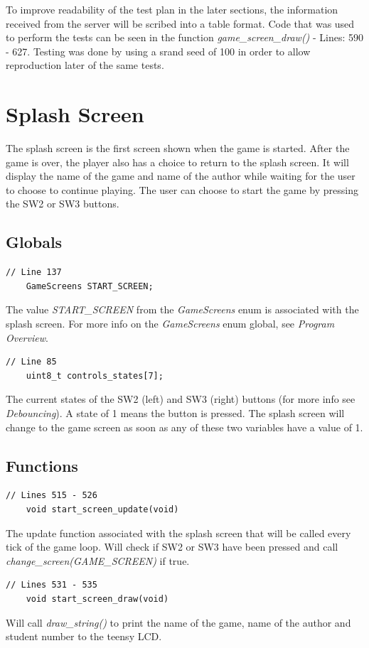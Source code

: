 \documentclass{article}
\begin{document}
To improve readability of the test plan in the later sections, the information received from the server will be scribed into a table format. Code that was used to perform the tests can be seen in the function \emph{game\_screen\_draw()} - Lines: 590 - 627.
\newline
\newline
Testing was done by using a srand seed of 100 in order to allow reproduction later of the same tests. 
\clearpage

\section{Splash Screen}
The splash screen is the first screen shown when the game is started. After the game is over, the player also has a choice to return to the splash screen. It will display the name of the game and name of the author while waiting for the user to choose to continue playing. The user can choose to start the game by pressing the SW2 or SW3 buttons.

\subsection*{Globals}
\begin{lstlisting}[style=CStyle]
	// Line 137
	GameScreens START_SCREEN;
\end{lstlisting}
The value \emph{START\_SCREEN} from the \emph{GameScreens} enum is associated with the splash screen. For more info on the \emph{GameScreens} enum global, see \emph{Program Overview}. 
\begin{lstlisting}[style=CStyle]
	// Line 85
	uint8_t controls_states[7];
\end{lstlisting}
The current states of the SW2 (left) and SW3 (right) buttons (for more info see \emph{Debouncing}). A state of 1 means the button is pressed. The splash screen will change to the game screen as soon as any of these two variables have a value of 1. 
\newline

\subsection*{Functions}
\begin{lstlisting}[style=CStyle]
	// Lines 515 - 526
	void start_screen_update(void)
\end{lstlisting}
The update function associated with the splash screen that will be called every tick of the game loop. Will check if SW2 or SW3 have been pressed and call \emph{change\_screen(GAME\_SCREEN)} if true.
\begin{lstlisting}[style=CStyle]
	// Lines 531 - 535
	void start_screen_draw(void)
\end{lstlisting}
Will call \emph{draw\_string()} to print the name of the game, name of the author and student number to the teensy LCD.  
\newline
\end{document}
